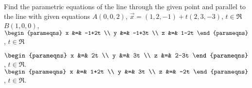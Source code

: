 
\begin{Exercise}[
name={},
title={}, 
difficulty=0,
origin={\cite{SM}}]
Find the parametric equations of the line through the given point and parallel to the line with given equations
\Question $A(0,0,2)$, $\vec{x}=(1,2,-1)+t(2,3,-3)$, $t\in\Re$
\Question $B(1,0,0)$, $\begin{parameqns} x &=& -1+2t \\ y &=& -1+3t \\ z &=& 1-2t \end{parameqns}$, $t\in\Re$
\end{Exercise}

\begin{Answer}
\Question $\begin{parameqns} x &=& 2t \\ y &=& 3t \\ z &=& 2-3t \end{parameqns}$, $t\in\Re$.
\Question $\begin{parameqns} x &=& 1+2t \\ y &=& 3t \\ z &=& -2t \end{parameqns}$, $t\in\Re$.
\end{Answer}
